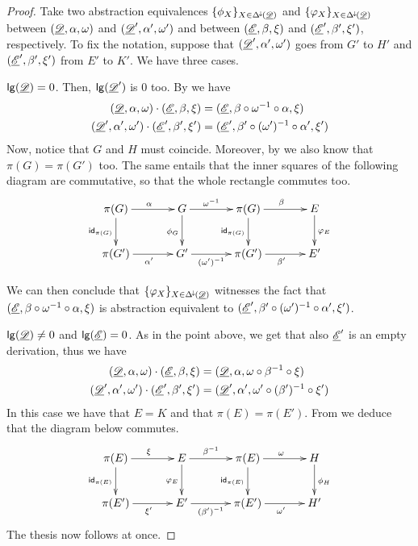 \begin{proof} Take two abstraction equivalences $\{\phi_X\}_{X\in \Delta^{\hspace{-1pt}\downarrow\hspace{-1pt}}(\underline{\mathscr{D}})}$ and $\{\varphi_X\}_{X\in \Delta^{\hspace{-1pt}\downarrow\hspace{-1pt}}(\underline{\mathscr{D}})}$ between $(\underline{\mathscr{D}}, \alpha, \omega)$ and $(\underline{\mathscr{D}}', \alpha', \omega')$ and between $(\underline{\mathscr{E}}, \beta, \xi)$ and $(\underline{\mathscr{E}}', \beta', \xi')$, respectively. To fix the notation, suppose that $(\underline{\mathscr{D}}', \alpha', \omega')$ goes from $G'$ to $H'$ and $(\underline{\mathscr{E}}', \beta', \xi')$ from $E'$ to $K'$. We have three cases.

	\smallskip \noindent  $\mathsf{lg}(\underline{\mathscr{D}})=0$. Then, $\mathsf{lg}(\underline{\mathscr{D}}')$ is $0$ too. By  we have
		\begin{align*}
			(\underline{\mathscr{D}}, \alpha, \omega)\cdot (\underline{\mathscr{E}}, \beta, \xi)&=(\underline{\mathscr{E}}, \beta\circ \omega^{-1}\circ \alpha, \xi)\\
			(\underline{\mathscr{D}}', \alpha', \omega')\cdot (\underline{\mathscr{E}}', \beta', \xi')&=(\underline{\mathscr{E}}', \beta'\circ (\omega')^{-1}\circ \alpha', \xi')
		\end{align*}
		Now, notice that $G$ and $H$ must coincide. Moreover, by  we also know that $\pi(G)=\pi(G')$ too. The same  entails that the inner squares of the following diagram are commutative, so that the whole rectangle commutes too.
		\[\xymatrix@C=35pt{\pi(G) \ar[r]^{\alpha} \ar[d]_{\id{\pi(G)}}& G  \ar[d]_{\phi_G}\ar[r]^-{\omega^{-1}} & \pi(G) \ar[d]_{\id{\pi(G)}} \ar[r]^{\beta}& E \ar[d]^{\varphi_E}\\\pi(G') \ar[r]_{\alpha'}& G' \ar[r]_-{(\omega')^{-1}} & \pi(G') \ar[r]_{\beta'} & E'}\]
		
		We can  then conclude that $\{\varphi_X\}_{X\in \Delta^{\hspace{-1pt}\downarrow\hspace{-1pt}}(\underline{\mathscr{D}})}$ witnesses the fact that $(\underline{\mathscr{E}}, \beta\circ \omega^{-1}\circ \alpha, \xi)$ is abstraction equivalent to $(\underline{\mathscr{E}}', \beta'\circ (\omega')^{-1}\circ \alpha', \xi')$.
		
\smallskip \noindent  $\mathsf{lg}(\underline{\mathscr{D}})\neq 0$ and $\mathsf{lg}(\underline{\mathscr{E}})= 0$. As in the point above, we get that also $\underline{\mathscr{E}}'$  is an empty derivation, thus we have
		\begin{align*}
			(\underline{\mathscr{D}}, \alpha, \omega)\cdot (\underline{\mathscr{E}}, \beta, \xi)&=(\underline{\mathscr{D}},  \alpha, \omega \circ \beta^{-1}\circ \xi)\\
			(\underline{\mathscr{D}}', \alpha', \omega')\cdot (\underline{\mathscr{E}}', \beta', \xi')&=(\underline{\mathscr{D}}',  \alpha', \omega' \circ (\beta')^{-1}\circ \xi')
		\end{align*}
		In this case we have that $E=K$ and that $\pi(E)=\pi(E')$. From  we deduce that the diagram below commutes.
		\[\xymatrix@C=35pt{\pi(E) \ar[r]^{\xi} \ar[d]_{\id{\pi(E)}}& E  \ar[d]_{\varphi_E}\ar[r]^-{\beta^{-1}} & \pi(E) \ar[d]_{\id{\pi(E)}} \ar[r]^{\omega}& H \ar[d]^{\phi_H}\\\pi(E') \ar[r]_{\xi'}& E' \ar[r]_-{(\beta')^{-1}} & \pi(E') \ar[r]_{\omega'} & H'}\]
		The thesis now follows at once.
		

\end{proof}
